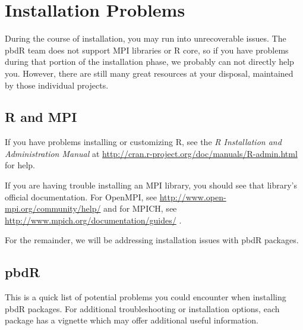 \section{Installation Problems}

During the course of installation, you may run into unrecoverable issues.  The pbdR team does not support MPI libraries or R core, so if you have problems during that portion of the installation phase, we probably can not directly help you.  However, there are still many great resources at your disposal, maintained by those individual projects.

\subsection{R and MPI}

If you have problems installing or customizing R, see the \emph{R Installation and Administration Manual} at \url{http://cran.r-project.org/doc/manuals/R-admin.html} for help.

If you are having trouble installing an MPI library, you should see that library's official documentation.  For OpenMPI, see \url{http://www.open-mpi.org/community/help/} and for MPICH, see \url{http://www.mpich.org/documentation/guides/} .

For the remainder, we will be addressing installation issues with pbdR packages.

\subsection{pbdR}

This is a quick list of potential problems you could encounter when installing pbdR packages.  For additional troubleshooting or installation options, each package has a vignette which may offer additional useful information.


